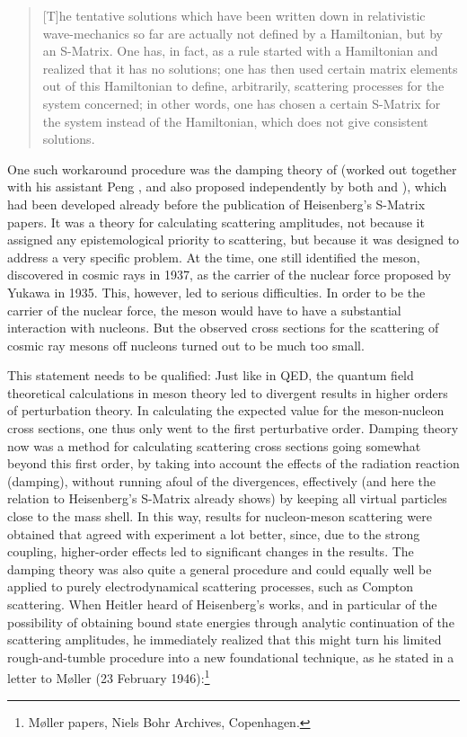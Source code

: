 \documentclass[12pt]{article}
\begin{document}
\begin{quote}
[T]he tentative solutions which have been written down in relativistic wave-mechanics so far are actually not defined by a Hamiltonian, but by an S-Matrix. One has, in fact, as a rule started with a Hamiltonian and realized that it has no solutions; one has then used certain matrix elements out of this Hamiltonian to define, arbitrarily, scattering processes for the system concerned; in other words, one has chosen a certain S-Matrix for the system instead of the Hamiltonian, which does not give consistent solutions.
\end{quote}

One such workaround procedure was the damping theory of \citet{heitler_1941_the-influence} (worked out together with his assistant Peng \citep{heitler_1942_the-influence}, and also proposed independently by both \citet{wilson_1941_the-quantum} and \citet{gora_1942_quantentheorie}), which had been developed already before the publication of Heisenberg's S-Matrix papers. It was a theory for calculating scattering amplitudes, not because it assigned any epistemological priority to scattering, but because it was designed to address a very specific problem. At the time, one still identified the meson, discovered in cosmic rays in 1937, as the carrier of the nuclear force proposed by Yukawa in 1935. This, however, led to serious difficulties. In order to be the carrier of the nuclear force, the meson would have to have a substantial interaction with nucleons. But the observed cross sections for the scattering of cosmic ray mesons off nucleons turned out to be much too small.

This statement needs to be qualified: Just like in QED, the quantum field theoretical calculations in meson theory led to divergent results in higher orders of perturbation theory. In calculating the expected value for the meson-nucleon cross sections, one thus only went to the first perturbative order. Damping theory now was a method for calculating scattering cross sections going somewhat beyond this first order, by taking into account the effects of the radiation reaction (damping), without running afoul of the divergences, effectively (and here the relation to Heisenberg's S-Matrix already shows) by keeping all virtual particles close to the mass shell. In this way, results for nucleon-meson scattering were obtained that agreed with experiment a lot better, since, due to the strong coupling, higher-order effects led to significant changes in the results. The damping theory was also quite a general procedure and could equally well be applied to purely electrodynamical scattering processes, such as Compton scattering. When Heitler heard of Heisenberg's works, and in particular of the possibility of obtaining bound state energies through analytic continuation of the scattering amplitudes, he immediately realized that this might turn his limited rough-and-tumble procedure into a new foundational technique, as he stated in a letter to M\o ller (23 February 1946):\footnote{M\o ller papers, Niels Bohr Archives, Copenhagen.}
\end{document}
